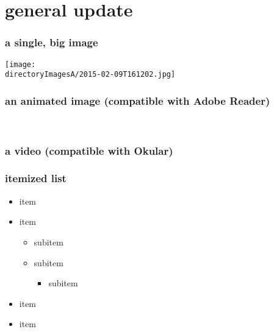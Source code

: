 \section{general update}

\begin{frame}
\frametitle{a single, big image}
\vspace{-0.24 cm}
\begin{center}
\texttt{[image: \\directoryImagesA/2015-02-09T161202.jpg]}\\
\end{center}
\end{frame}

\begin{frame}
\frametitle{an animated image (compatible with Adobe Reader)}
\vspace{-0.24 cm}
\begin{center}
\\
\end{center}
\end{frame}

\begin{frame}
\frametitle{a video (compatible with Okular)}
\vspace{-0.24 cm}
\begin{center}
\end{center}
\end{frame}

\begin{frame}
\frametitle{itemized list}
\begin{itemize}
\item item
\item item
    \begin{itemize}
    \item subitem
    \item subitem
        \begin{itemize}
        \item subitem
        \end{itemize}
    \end{itemize}
\item item
\item item
\end{itemize}
\end{frame}

